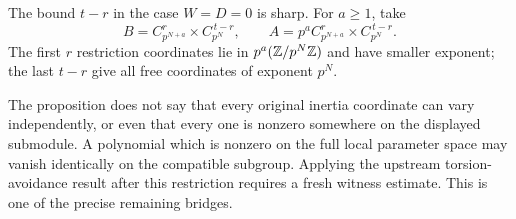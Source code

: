 The bound $t-r$ in the case $W=D=0$ is sharp. For $a\ge1$, take
\[
 B=C_{p^{N+a}}^r\times C_{p^N}^{\,t-r},\qquad
 A=p^aC_{p^{N+a}}^r\times C_{p^N}^{\,t-r}.
\]
The first $r$ restriction coordinates lie in $p^a(\mathbb Z/p^N\mathbb Z)$ and have smaller exponent; the last $t-r$ give all free coordinates of exponent $p^N$.

The proposition does not say that every original inertia coordinate can vary independently, or even that every one is nonzero somewhere on the displayed submodule. A polynomial which is nonzero on the full local parameter space may vanish identically on the compatible subgroup. Applying the upstream torsion-avoidance result after this restriction requires a fresh witness estimate. This is one of the precise remaining bridges.
